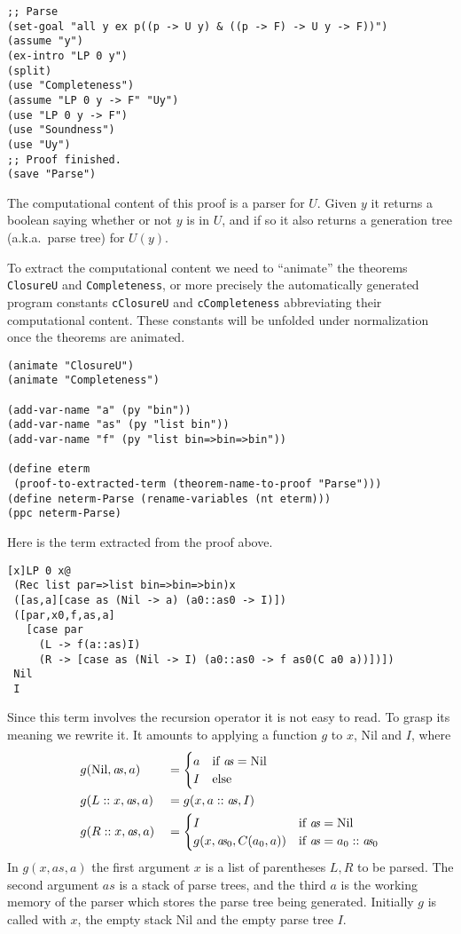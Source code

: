 \documentclass[12pt]{amsart}
\newcommand{\nil}{\mathrm{Nil}}
\newcommand{\as}{\mathit{a}\!\mathit{s}}
\newcommand{\inquotes}[1]{``#1''}
\begin{document}
\begin{appendix}
\begin{verbatim}
;; Parse
(set-goal "all y ex p((p -> U y) & ((p -> F) -> U y -> F))")
(assume "y")
(ex-intro "LP 0 y")
(split)
(use "Completeness")
(assume "LP 0 y -> F" "Uy")
(use "LP 0 y -> F")
(use "Soundness")
(use "Uy")
;; Proof finished.
(save "Parse")
\end{verbatim}
The computational content of this proof is a parser for $U$.  Given
$y$ it returns a boolean saying whether or not $y$ is in $U$, and if
so it also returns a generation tree (a.k.a.\ parse tree) for $U(y)$.

To extract the computational content we need to \inquotes{animate} the
theorems \verb|ClosureU| and \verb|Completeness|, or more precisely
the automatically generated program constants \verb|cClosureU| and
\verb|cCompleteness| abbreviating their computational content.
These constants will be unfolded under normalization once the theorems
are animated.
\begin{verbatim}
(animate "ClosureU")
(animate "Completeness")

(add-var-name "a" (py "bin"))
(add-var-name "as" (py "list bin"))
(add-var-name "f" (py "list bin=>bin=>bin"))

(define eterm
 (proof-to-extracted-term (theorem-name-to-proof "Parse")))
(define neterm-Parse (rename-variables (nt eterm)))
(ppc neterm-Parse)
\end{verbatim}
Here is the term extracted from the proof above.
\begin{verbatim}
[x]LP 0 x@
 (Rec list par=>list bin=>bin=>bin)x
 ([as,a][case as (Nil -> a) (a0::as0 -> I)])
 ([par,x0,f,as,a]
   [case par
     (L -> f(a::as)I)
     (R -> [case as (Nil -> I) (a0::as0 -> f as0(C a0 a))])])
 Nil 
 I
\end{verbatim}
Since this term involves the recursion operator it is not easy to
read.  To grasp its meaning we rewrite it.  It amounts to applying a
function $g$ to $x$, $\nil$ and $I$, where
\begin{alignat*}{2}
  &g(\nil,\as,a) &&=
  \begin{cases}
    a &\hbox{if $\as = \nil$}
    \\
    I &\hbox{else}
  \end{cases}
  \\
  &g(L::x,\as,a) &&=g(x,a::\as,I)
  \\
  &g(R::x,\as,a) &&=
  \begin{cases}
    I &\hbox{if $\as = \nil$}
    \\
    g(x,\as_0,C(a_0,a)) &\hbox{if $\as=a_0::\as_0$}
  \end{cases}
\end{alignat*}
In $g(x,\as,a)$ the first argument $x$ is a list of parentheses $L,R$
to be parsed.  The second argument $\as$ is a stack of parse trees,
and the third $a$ is the working memory of the parser which stores the
parse tree being generated.  Initially $g$ is called with $x$, the
empty stack $\nil$ and the empty parse tree $I$.


\end{appendix}
\end{document}
